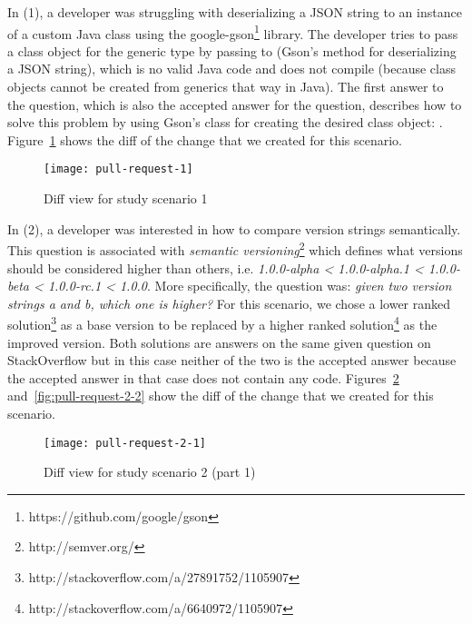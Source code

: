 \documentclass[../manifest.tex]{subfiles}
\begin{document}
In (1), a developer was struggling with deserializing a JSON string to an instance of a custom Java class using the google-gson\footnote{https://github.com/google/gson} library. The developer tries to pass a class object for the generic type  by passing  to  (Gson's method for deserializing a JSON string), which is no valid Java code and does not compile (because class objects cannot be created from generics that way in Java). The first answer to the question, which is also the accepted answer for the question, describes how to solve this problem by using Gson's  class for creating the desired class object: . Figure~\ref{fig:pull-request-1} shows the diff of the change that we created for this scenario.

\begin{figure}[h]
  \centering
  \texttt{[image: pull-request-1]}
  \caption{Diff view for study scenario 1}
  \label{fig:pull-request-1}
\end{figure}

In (2), a developer was interested in how to compare version strings semantically. This question is associated with \textit{semantic versioning}\footnote{http://semver.org/} which defines what versions should be considered higher than others, i.e. \textit{1.0.0-alpha < 1.0.0-alpha.1 < 1.0.0-beta < 1.0.0-rc.1 < 1.0.0}. More specifically, the question was: \textit{given two version strings a and b, which one is higher?} For this scenario, we chose a lower ranked solution\footnote{http://stackoverflow.com/a/27891752/1105907} as a base version to be replaced by a higher ranked solution\footnote{http://stackoverflow.com/a/6640972/1105907} as the improved version. Both solutions are answers on the same given question on StackOverflow but in this case neither of the two is the accepted answer because the accepted answer in that case does not contain any code. Figures~\ref{fig:pull-request-2-1} and~\ref{fig:pull-request-2-2} show the diff of the change that we created for this scenario.


\begin{figure}[h]
  \centering
  \texttt{[image: pull-request-2-1]}
  \caption{Diff view for study scenario 2 (part 1)}
  \label{fig:pull-request-2-1}
\end{figure}
\end{document}
